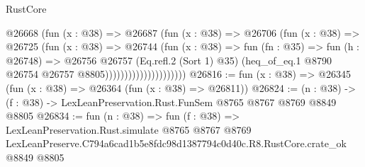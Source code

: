 \begin{lexlean}{RustCore}
\begin{coremodule}
                                @26668
                                  (fun (x : @38) =>
                                  @26687
                                    (fun (x : @38) =>
                                    @26706
                                      (fun (x : @38) =>
                                      @26725
                                        (fun (x : @38) =>
                                        @26744
                                          (fun (x : @38) =>
                                          fun (fn : @35) =>
                                          fun (h : @26748) =>
                                          @26756
                                            @26757
                                            (Eq.refl.{2} (Sort 1) @35)
                                            (heq_of_eq.{1}
                                              @8790
                                              @26754
                                              @26757
                                              @8805)))))))))))))))))))))
@26816 := fun (x : @38) => @26345 (fun (x : @38) => @26364 (fun (x : @38) => @26811))
@26824 := (n : @38) -> (f : @38) -> LexLeanPreservation.Rust.FunSem @8765 @8767 @8769 @8849 @8805
@26834 := fun (n : @38) =>
  fun (f : @38) =>
  LexLeanPreservation.Rust.simulate
    @8765
    @8767
    @8769
    LexLeanPreserve.C794a6cad1b5e8fdc98d1387794c0d40c.R8.RustCore.crate_ok
    @8849
    @8805
\end{coremodule}
\end{lexlean}
